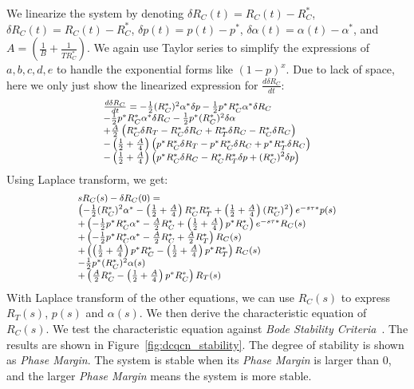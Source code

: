 We linearize the system by denoting $\delta {R_C}(t) = {R_C}(t) - R_C^*$,
$\delta {R_C}(t) = {R_C}(t) - R_C^*$, $\delta p(t) = p(t) - p^*$, $\delta \alpha
(t) = \alpha (t) - \alpha^*$, and $A = \left( {\frac{1}{B} + \frac{1}{{TR_C^*}}}
\right)$.  We again use Taylor series to simplify the expressions of $a, b, c,
d, e$ to handle the exponential forms like $(1-p)^x$.  Due to lack of space,
here we only just show the linearized expression for $\frac{{d\delta {R_C}}}{{dt}}$:
\begin{equation}
\small
\begin{array}{l}
\frac{{d\delta {R_C}}}{{dt}} =  - \frac{1}{2}{(R_C^*)^2}{\alpha ^*}\delta p - \frac{1}{2}{p^*}R_C^*{\alpha ^*}\delta R_C \\
 - \frac{1}{2}{p^*}R_C^*{\alpha ^*}\delta {R_C} - \frac{1}{2}{p^*}{(R_C^*)^2}\delta \alpha \\
 + \frac{A}{2}\left( {R_C^*\delta {R_T} - R_C^*\delta {R_C} + R_T^*\delta {R_C} - R_C^*\delta R_C} \right)\\
 - \left( {\frac{1}{2} + \frac{A}{4}} \right)\left( {{p^*}R_C^*\delta {R_T} - {p^*}R_C^*\delta {R_C} + {p^*}R_T^*\delta {R_C}} \right)\\ 
 - \left( {\frac{1}{2} + \frac{A}{4}} \right)\left( {{p^*}R_C^*\delta R_C - R_C^*R_T^*\delta p + {{(R_C^*)}^2}\delta p} \right)
\end{array}
\end{equation}
Using Laplace transform, we get:
\begin{equation}
\small
\begin{array}{l}
s{R_C}(s) - \delta {R_C}(0) = \\
\left( { - \frac{1}{2}{{(R_C^*)}^2}{\alpha ^*} - \left( {\frac{1}{2} + \frac{A}{4}} \right)R_C^*R_T^* + \left( {\frac{1}{2} + \frac{A}{4}} \right){{(R_C^*)}^2}} \right){e^{ - s\tau *}}p(s)\\
 + \left( { - \frac{1}{2}{p^*}R_C^*{\alpha ^*} - \frac{A}{2}R_C^* + \left( {\frac{1}{2} + \frac{A}{4}} \right){p^*}R_C^*} \right){e^{ - s\tau *}}{R_C}(s)\\
 + \left( { - \frac{1}{2}{p^*}R_C^*{\alpha ^*} - \frac{A}{2}R_C^* + \frac{A}{2}R_T^* }\right){R_C}(s)\\
 + \left( { \left( {\frac{1}{2} + \frac{A}{4}} \right){p^*}R_C^* - \left( {\frac{1}{2} + \frac{A}{4}} \right){p^*}R_T^*} \right){R_C}(s)\\
 - \frac{1}{2}{p^*}{(R_C^*)^2}\alpha (s)\\
 + \left( {\frac{A}{2}R_C^* - \left( {\frac{1}{2} + \frac{A}{4}} \right){p^*}R_C^*} \right){R_T}(s)
\end{array}
\end{equation}
With Laplace transform of the other equations, we can use ${R_C}(s)$ to express
${R_T}(s)$, $p(s)$ and $\alpha (s)$.  We then derive the characteristic equation
of ${R_C}(s)$. We test the characteristic equation against {\em Bode Stability
Criteria}~\cite{controltheory}. The results are shown in
Figure~\ref{fig:dcqcn_stability}.  The degree of stability is shown as {\em
Phase Margin}. The system is stable when its {\em Phase Margin} is larger than
0, and the larger {\em Phase Margin} means the system is more stable.

